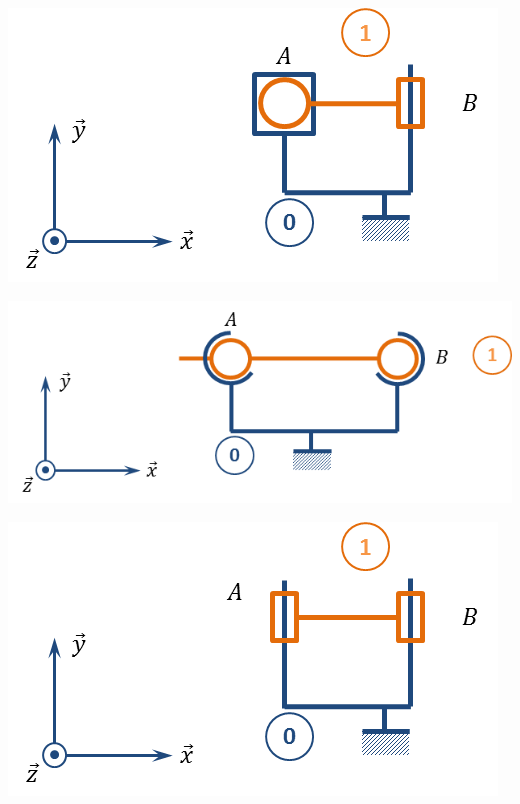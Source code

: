 \documentclass[10pt]{article}
\begin{document}
\begin{minipage}[c]{.32\linewidth}
\begin{center}
\includegraphics[width=.95\textwidth]{images/fig_07}
\end{center}
\end{minipage}\hfill
\begin{minipage}[c]{.32\linewidth}
\begin{center}
\includegraphics[width=.95\textwidth]{images/fig_08}
\end{center}
\end{minipage}\hfill
\begin{minipage}[c]{.32\linewidth}
\begin{center}
\includegraphics[width=.95\textwidth]{images/fig_09}
\end{center}
\end{minipage}
\end{document}
